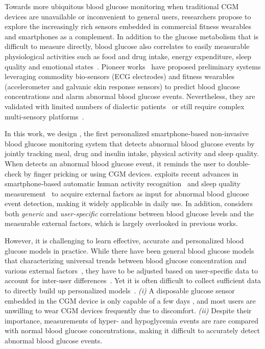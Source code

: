 Towards more ubiquitous blood glucose monitoring when traditional CGM devices are unavailable or inconvenient to general users, researchers propose to explore the increasingly rich sensors embedded in commercial fitness wearables and smartphones as a complement.
In addition to the glucose metabolism that is difficult to measure directly, blood glucose also correlates to easily measurable physiological activities such as food and drug intake, energy expenditure, sleep quality and emotional states~\cite{bib:DRCP15:Iwasaki}.
Pioneer works~\cite{bib:EMBC12:Nguyen, bib:SEMPER16:Ranvier, bib:JDST14:Sobel} have proposed preliminary systems leveraging commodity bio-sensors (\eg ECG electrodes) and fitness wearables (\eg accelerometer and galvanic skin response sensors) to predict blood glucose concentrations and alarm abnormal blood glucose events.
Nevertheless, they are validated with limited numbers of dialectic patients~\cite{bib:SEMPER16:Ranvier, bib:JDST14:Sobel} or still require complex multi-sensory platforms~\cite{bib:EMBC12:Nguyen, bib:JDST14:Sobel}.

In this work, we design \sysname, the first personalized smartphone-based non-invasive blood glucose monitoring system that detects abnormal blood glucose events by jointly tracking meal, drug and insulin intake, physical activity and sleep quality.
When \sysname detects an abnormal blood glucose event, it reminds the user to double-check by finger pricking or using CGM devices.
\sysname exploits recent advances in smartphone-based automatic human activity recognition~\cite{bib:KDDEN11:Kwapisz} and sleep quality measurement~\cite{bib:UbiComp14:Gu} to acquire external factors as input for abnormal blood glucose event detection, making it widely applicable in daily use.
In addition, \sysname considers both \emph{generic} and \emph{user-specific} correlations between blood glucose levels and the measurable external factors, which is largely overlooked in previous works.

However, it is challenging to learn effective, accurate and personalized blood glucose models in practice.
While there have been general blood glucose models that characterizing universal trends between blood glucose concentration and various external factors~\cite{bib:IJNMBE16:Oviedo}, they have to be adjusted based on user-specific data to account for inter-user differences~\cite{bib:ICMLA13:Bunescu}.
Yet it is often difficult to collect sufficient data to directly build up personalized models~\cite{bib:KDHealth16:Marling}.
\emph{(i)}
A disposable glucose sensor embedded in the CGM device is only capable of a few days \cite{bib:CGM_wiki, bib:CGM_wave}, and most users are unwilling to wear CGM devices frequently due to discomfort.
\emph{(ii)}
Despite their importance, measurements of hyper- and hypoglycemia events are rare compared with normal blood glucose concentrations, making it difficult to accurately detect abnormal blood glucose events.

